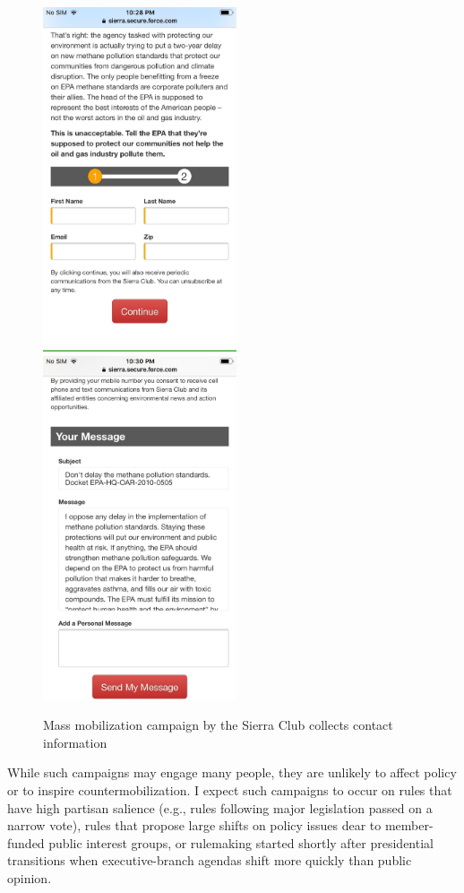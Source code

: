\begin{subhyp}
\begin{figure}
    \caption{Mass mobilization campaign by the Sierra Club collects contact information}
    \centering
    \includegraphics[height = 4in]{Figs/sierra1.jpeg}
    \includegraphics[height = 4in]{Figs/sierra2.jpeg}
    \label{fig:sierra}
\end{figure}

While such campaigns may engage many people, they are unlikely to affect policy or to inspire countermobilization. I expect such campaigns to occur on rules that have high partisan salience (e.g., rules following major legislation passed on a narrow vote), rules that propose large shifts on policy issues dear to member-funded public interest groups, or rulemaking started shortly after presidential transitions when executive-branch agendas shift more quickly than public opinion.


\end{subhyp}
